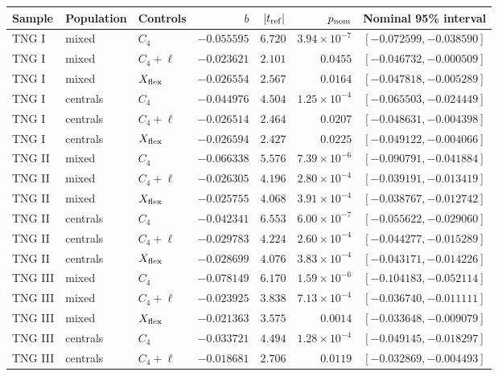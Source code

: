 \begin{tabular}{lllrrrl}
\toprule
Sample & Population & Controls & $b$ & $|t_{\rm ref}|$ & $p_{\rm nom}$ & Nominal 95\% interval \\
\midrule
TNG I & mixed & $C_4$ & $-0.055595$ & $6.720$ & $3.94\times10^{-7}$ & $[-0.072599, -0.038590]$ \\
TNG I & mixed & $C_4+\ell$ & $-0.023621$ & $2.101$ & $0.0455$ & $[-0.046732, -0.000509]$ \\
TNG I & mixed & $X_{\rm flex}$ & $-0.026554$ & $2.567$ & $0.0164$ & $[-0.047818, -0.005289]$ \\
TNG I & centrals & $C_4$ & $-0.044976$ & $4.504$ & $1.25\times10^{-4}$ & $[-0.065503, -0.024449]$ \\
TNG I & centrals & $C_4+\ell$ & $-0.026514$ & $2.464$ & $0.0207$ & $[-0.048631, -0.004398]$ \\
TNG I & centrals & $X_{\rm flex}$ & $-0.026594$ & $2.427$ & $0.0225$ & $[-0.049122, -0.004066]$ \\
TNG II & mixed & $C_4$ & $-0.066338$ & $5.576$ & $7.39\times10^{-6}$ & $[-0.090791, -0.041884]$ \\
TNG II & mixed & $C_4+\ell$ & $-0.026305$ & $4.196$ & $2.80\times10^{-4}$ & $[-0.039191, -0.013419]$ \\
TNG II & mixed & $X_{\rm flex}$ & $-0.025755$ & $4.068$ & $3.91\times10^{-4}$ & $[-0.038767, -0.012742]$ \\
TNG II & centrals & $C_4$ & $-0.042341$ & $6.553$ & $6.00\times10^{-7}$ & $[-0.055622, -0.029060]$ \\
TNG II & centrals & $C_4+\ell$ & $-0.029783$ & $4.224$ & $2.60\times10^{-4}$ & $[-0.044277, -0.015289]$ \\
TNG II & centrals & $X_{\rm flex}$ & $-0.028699$ & $4.076$ & $3.83\times10^{-4}$ & $[-0.043171, -0.014226]$ \\
TNG III & mixed & $C_4$ & $-0.078149$ & $6.170$ & $1.59\times10^{-6}$ & $[-0.104183, -0.052114]$ \\
TNG III & mixed & $C_4+\ell$ & $-0.023925$ & $3.838$ & $7.13\times10^{-4}$ & $[-0.036740, -0.011111]$ \\
TNG III & mixed & $X_{\rm flex}$ & $-0.021363$ & $3.575$ & $0.0014$ & $[-0.033648, -0.009079]$ \\
TNG III & centrals & $C_4$ & $-0.033721$ & $4.494$ & $1.28\times10^{-4}$ & $[-0.049145, -0.018297]$ \\
TNG III & centrals & $C_4+\ell$ & $-0.018681$ & $2.706$ & $0.0119$ & $[-0.032869, -0.004493]$ \\

\end{tabular}
